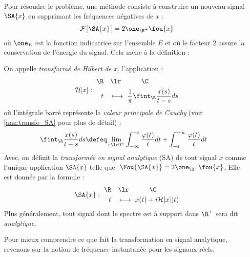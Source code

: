 Pour résoudre le problème, une méthode consiste à construire un nouveau signal $\SA{x}$ en supprimant les fréquences négatives de $x$ :
\[\mathcal{F}\big[\SA{x}\big] = 2\one_{\R^+}\fou{x}\]
où $\one_E$ est la fonction indicatrice sur l'ensemble $E$ et où le facteur 2 assure la conservation de l'énergie du signal. Cela mène à la définition :

\begin{definition}\label{def:transfo_sa&hilbert}
	On appelle \emph{transformé de Hilbert de} $x$, l'application :
	\begin{equation}\label{eq:transfo_Hilb}
		\mathcal{H}[x] :\ \begin{aligned} 
			\R \quad &\lr\qquad\quad \C \\	
			t\quad &\longmapsto\ \frac{1}{\pi}\fint_\R \frac{x(s)}{t-s}ds %
		\end{aligned}
	\end{equation}
	où l'intégrale barré représente la \emph{valeur principale de Cauchy} (voir \cref{ann:transfo_SA} pour plus de détail) :
	\begin{align*}
		\fint_\R \frac{x(s)}{t-s}ds &\defeq \lim_{\varepsilon\lr0^+} \int_{-\infty}^{-\varepsilon} \frac{\varphi(t)}{t}dt + \int_{+\varepsilon}^{+\infty} \frac{\varphi(t)}{t}dt 
	\end{align*}
	Avec, on définit la \emph{transformée en signal analytique} (SA) de tout signal $x$ comme l'unique application $\SA{x}$ telle que $\ \Fou{\SA{x}\big.}= 2\one_{\R^+}\fou{x}$. Elle est donnée par la formule :
	\begin{equation}\label{eq:transfo_SA}
		\SA{x} :\ \begin{aligned} 
			\R \quad &\lr\qquad\quad \C \\	
			t\quad &\longmapsto\ x(t) + i\mathcal{H}[x](t) %
		\end{aligned}
	\end{equation}
	Plus généralement, tout signal dont le spectre est à support dans $\R^+$ sera dit \emph{analytique}.
\end{definition}
\skipl

Pour mieux comprendre ce que fait la transformation en signal analytique, revenons sur la notion de fréquence instantanée pour les signaux réels.
\\



